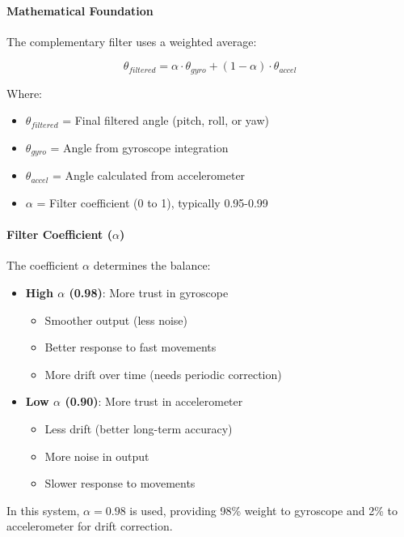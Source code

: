 \documentclass[11pt,a4paper]{article}
\begin{document}
\paragraph{Mathematical Foundation}
The complementary filter uses a weighted average:

\begin{equation}
\theta_{filtered} = \alpha \cdot \theta_{gyro} + (1 - \alpha) \cdot \theta_{accel}
\end{equation}

Where:
\begin{itemize}
    \item $\theta_{filtered}$ = Final filtered angle (pitch, roll, or yaw)
    \item $\theta_{gyro}$ = Angle from gyroscope integration
    \item $\theta_{accel}$ = Angle calculated from accelerometer
    \item $\alpha$ = Filter coefficient (0 to 1), typically 0.95-0.99
\end{itemize}

\paragraph{Filter Coefficient ($\alpha$)}
The coefficient $\alpha$ determines the balance:
\begin{itemize}
    \item \textbf{High $\alpha$ (0.98)}: More trust in gyroscope
    \begin{itemize}
        \item Smoother output (less noise)
        \item Better response to fast movements
        \item More drift over time (needs periodic correction)
    \end{itemize}
    \item \textbf{Low $\alpha$ (0.90)}: More trust in accelerometer
    \begin{itemize}
        \item Less drift (better long-term accuracy)
        \item More noise in output
        \item Slower response to movements
    \end{itemize}
\end{itemize}

In this system, $\alpha = 0.98$ is used, providing 98\% weight to gyroscope and 2\% to accelerometer for drift correction.
\end{document}
